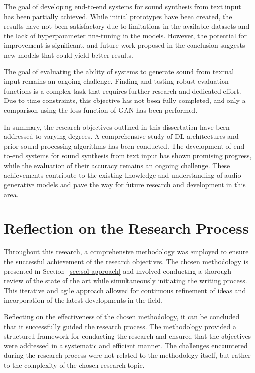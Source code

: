 The goal of developing end-to-end systems for sound synthesis from text input has been partially achieved. While initial prototypes have been created, the results have not been satisfactory due to limitations in the available datasets and the lack of hyperparameter fine-tuning in the models. However, the potential for improvement is significant, and future work proposed in the conclusion suggests new models that could yield better results.

The goal of evaluating the ability of systems to generate sound from textual input remains an ongoing challenge. Finding and testing robust evaluation functions is a complex task that requires further research and dedicated effort. Due to time constraints, this objective has not been fully completed, and only a comparison using the loss function of \ac{GAN} has been performed. 

In summary, the research objectives outlined in this dissertation have been addressed to varying degrees. A comprehensive study of \ac{DL} architectures and prior sound processing algorithms has been conducted. The development of end-to-end systems for sound synthesis from text input has shown promising progress, while the evaluation of their accuracy remains an ongoing challenge. These achievements contribute to the existing knowledge and understanding of audio generative models and pave the way for future research and development in this area.

\section{Reflection on the Research Process} \label{sec:reflection-process}

Throughout this research, a comprehensive methodology was employed to ensure the successful achievement of the research objectives. The chosen methodology is presented in Section~\ref{sec:sol-approach} and involved conducting a thorough review of the state of the art while simultaneously initiating the writing process. This iterative and agile approach allowed for continuous refinement of ideas and incorporation of the latest developments in the field.

Reflecting on the effectiveness of the chosen methodology, it can be concluded that it successfully guided the research process. The methodology provided a structured framework for conducting the research and ensured that the objectives were addressed in a systematic and efficient manner. The challenges encountered during the research process were not related to the methodology itself, but rather to the complexity of the chosen research topic.

